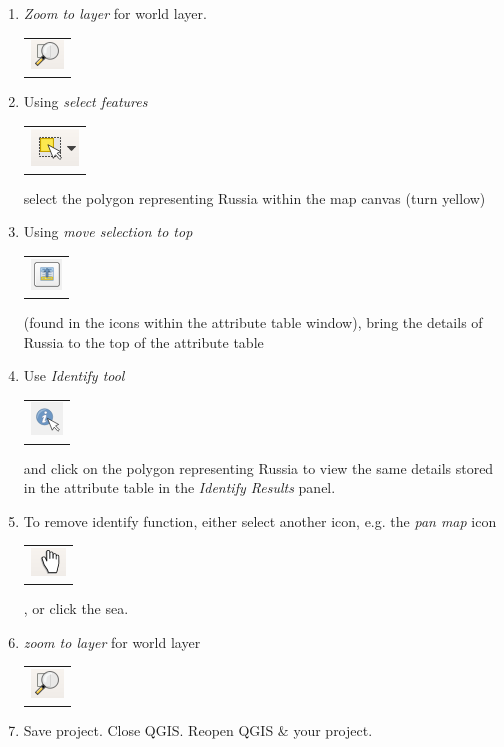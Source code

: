 \documentclass{article}
\begin{document}
\begin{enumerate}
	\item \textit{Zoom to layer} for world layer. \begin{tabular}{@{}c@{}}\includegraphics[width=3ex]{images/zoom_to_layer_icon.png}\end{tabular}
	\item Using \textit{select features} 
	\begin{tabular}{@{}c@{}}\includegraphics[width=3ex]{images/select_features_icon.png}\end{tabular}
	select the polygon representing Russia within the map canvas (turn yellow)
	\item Using \textit{move selection to top} 
	\begin{tabular}{@{}c@{}}\includegraphics[width=3ex]{images/move_selection_to_top_icon.png}\end{tabular}
	(found in the icons within the attribute table window), bring the details of Russia to the top of the attribute table
	\item Use \textit{Identify tool} 
	\begin{tabular}{@{}c@{}}\includegraphics[width=3ex]{images/identify_feature_icon.png}\end{tabular}
	and click on the polygon representing Russia to view the same details stored in the attribute table in the \textit{Identify Results} panel.
	\item To remove identify function, either select another icon, e.g. the \textit{pan map} icon 
	\begin{tabular}{@{}c@{}}\includegraphics[width=3ex]{images/pan_map_icon.png}\end{tabular}
	, or click the sea.
	\item \textit{zoom to layer} for world layer
	\begin{tabular}{@{}c@{}}\includegraphics[width=3ex]{images/zoom_to_layer_icon.png}\end{tabular}
	\item Save project. Close QGIS. Reopen QGIS \& your project.
\end{enumerate}
\end{document}
